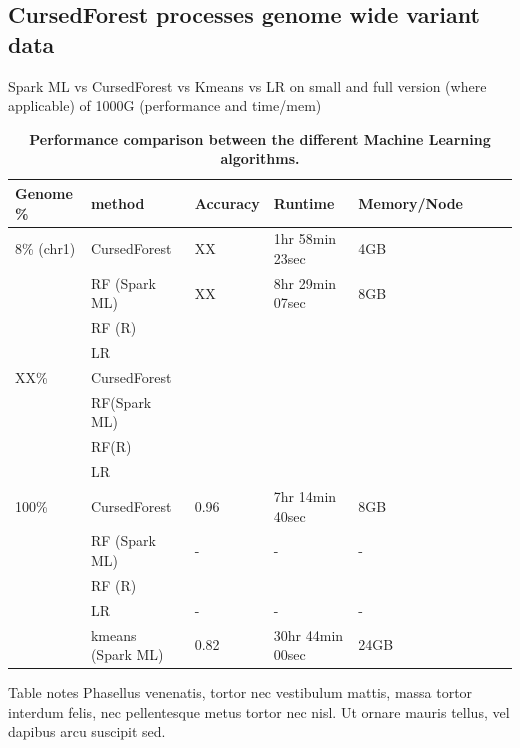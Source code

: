 \documentclass[10pt,letterpaper]{article}
\begin{document}
\subsection*{CursedForest processes genome wide variant data}
\label{comp}
Spark ML vs CursedForest vs Kmeans vs LR on small and full version (where applicable) of 1000G (performance and
time/mem)


\begin{table}[!ht]
\caption{
{\bf Performance comparison between the different Machine Learning algorithms.}}
\begin{tabular}{|l|l|l|l|l|l|l|l|}
\hline
\bf{Genome \%}  & \bf{method} & \bf{Accuracy} & \bf{Runtime} & \bf{Memory/Node} \\
\hline
8\% (chr1) & CursedForest & XX & 1hr 58min 23sec & 4GB \\ \hline
          & RF (Spark ML) & XX & 8hr 29min 07sec & 8GB \\ \hline
          &  RF (R) & &  &\\ \hline
          &  LR & &  &\\ \hline
XX\% & CursedForest & &  &\\ \hline
          & RF(Spark ML) & &  &\\ \hline
          &  RF(R) & &  &\\ \hline
          &  LR & &  &\\ \hline

100\% & CursedForest & 0.96 & 7hr 14min 40sec & 8GB \\ \hline
          & RF (Spark ML) & - & - & - \\ \hline
          &  RF (R) & &  &\\ \hline
          &  LR & - & - & - \\ \hline
          & kmeans (Spark ML) & 0.82 & 30hr 44min 00sec & 24GB \\ \hline
\end{tabular}
\begin{flushleft} 
  Table notes Phasellus venenatis, tortor nec vestibulum mattis, massa tortor interdum felis, nec pellentesque metus
  tortor nec nisl. Ut ornare mauris tellus, vel dapibus arcu suscipit sed.
\end{flushleft}
\label{table1}
\end{table}
\end{document}
